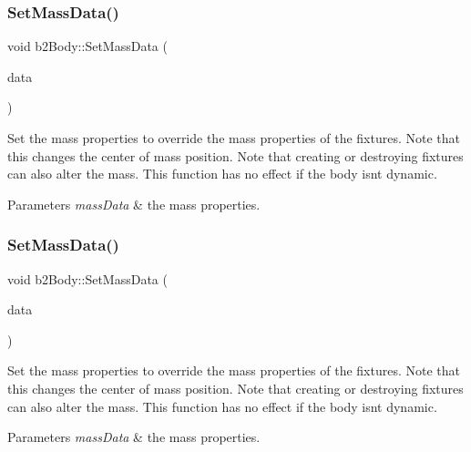\subsubsection{\texorpdfstring{Set\+Mass\+Data()}{SetMassData()}\hspace{0.1cm}{\footnotesize\ttfamily [1/2]}}
{\footnotesize\ttfamily void b2\+Body\+::\+Set\+Mass\+Data (\begin{DoxyParamCaption}\item[{const \hyperlink{structb2MassData}{b2\+Mass\+Data} $\ast$}]{data }\end{DoxyParamCaption})}

Set the mass properties to override the mass properties of the fixtures. Note that this changes the center of mass position. Note that creating or destroying fixtures can also alter the mass. This function has no effect if the body isn\textquotesingle{}t dynamic. 
\begin{DoxyParams}{Parameters}
{\em mass\+Data} & the mass properties. \\
\hline
\end{DoxyParams}
\mbox{\label{classb2Body_a58a641fedf8a81e1e26d09ec00a22fe2}} 
\subsubsection{\texorpdfstring{Set\+Mass\+Data()}{SetMassData()}\hspace{0.1cm}{\footnotesize\ttfamily [2/2]}}
{\footnotesize\ttfamily void b2\+Body\+::\+Set\+Mass\+Data (\begin{DoxyParamCaption}\item[{const \hyperlink{structb2MassData}{b2\+Mass\+Data} $\ast$}]{data }\end{DoxyParamCaption})}

Set the mass properties to override the mass properties of the fixtures. Note that this changes the center of mass position. Note that creating or destroying fixtures can also alter the mass. This function has no effect if the body isn\textquotesingle{}t dynamic. 
\begin{DoxyParams}{Parameters}
{\em mass\+Data} & the mass properties. \\
\hline
\end{DoxyParams}
\mbox{\label{classb2Body_a229a6de228416203fecbf7a7544c33bb}} 
